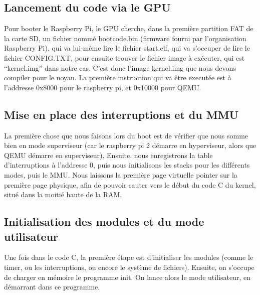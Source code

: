 \documentclass[a4paper]{article}
\begin{document}
\subsection{Lancement du code via le GPU}

Pour booter le Raspberry Pi, le GPU cherche, dans la première partition FAT de la
carte SD, un fichier nommé bootcode.bin (firmware fourni par l'organisation Raspberry Pi),
qui va lui-même lire le fichier start.elf, qui va s'occuper de lire le fichier CONFIG.TXT, pour
ensuite trouver le fichier image à exécuter, qui est ``kernel.img'' dans notre
cas. %
C'est donc l'image kernel.img que nous devons compiler pour le noyau. La
première instruction qui va être executée est à l'addresse 0x8000 pour le
raspberry pi, et 0x10000 pour QEMU.

\subsection{Mise en place des interruptions et du MMU}

La première chose que nous faisons lors du boot est de vérifier que nous somme
bien en mode superviseur (car le raspberry pi 2 démarre en hyperviseur, alors
que QEMU démarre en superviseur). Ensuite, nous enregistrons la table
d'interruptions à l'addresse 0, puis nous initialisons les stacks pour les
différents modes, puis le MMU. Nous laissons la première page virtuelle pointer
sur la première page physique, afin de pouvoir sauter vers le début du code C du
kernel, situé dans la moitié haute de la RAM.

\subsection{Initialisation des modules et du mode utilisateur}

Une fois dans le code C, la première étape est d'initialiser les modules (comme
le timer, ou les interruptions, ou encore le système de fichiers). Ensuite, on
s'occupe de charger en mémoire le programme init. On lance alors le mode
utilisateur, en démarrant dans ce programme.
\end{document}

